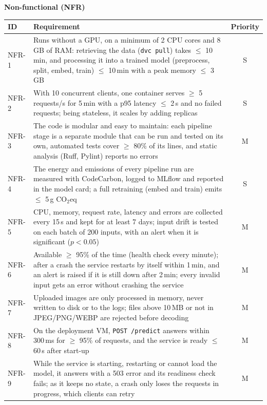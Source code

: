 \documentclass[11pt]{article}
\begin{document}
\newpage


\medskip\noindent\textbf{Non-functional (NFR)}\par\smallskip


\noindent\begin{tabularx}{\textwidth}{@{}l Y c@{}}
\toprule
\textbf{ID} & \textbf{Requirement} & \textbf{Priority} \\
\midrule
NFR-1 & Runs without a GPU, on a minimum of 2 CPU cores and 8\,GB of RAM: retrieving the data (\texttt{dvc pull}) takes $\leq$ 10\,min, and processing it into a trained model (preprocess, split, embed, train) $\leq$ 10\,min with a peak memory $\leq$ 3\,GB & S \medskip \\
NFR-2 & With 10 concurrent clients, one container serves $\geq$ 5 requests/s for 5\,min with a p95 latency $\leq$ 2\,s and no failed requests; being stateless, it scales by adding replicas & S \medskip \\
NFR-3 & The code is modular and easy to maintain: each pipeline stage is a separate module that can be run and tested on its own, automated tests cover $\geq$ 80\% of its lines, and static analysis (Ruff, Pylint) reports no errors & M \medskip \\
NFR-4 & The energy and emissions of every pipeline run are measured with CodeCarbon, logged to MLflow and reported in the model card; a full retraining (embed and train) emits $\leq$ 5\,g CO$_2$eq & S \medskip \\
NFR-5 & CPU, memory, request rate, latency and errors are collected every 15\,s and kept for at least 7 days; input drift is tested on each batch of 200 inputs, with an alert when it is significant ($p < 0.05$) & M \medskip \\
NFR-6 & Available $\geq$ 95\% of the time (health check every minute); after a crash the service restarts by itself within 1\,min, and an alert is raised if it is still down after 2\,min; every invalid input gets an error without crashing the service & M \medskip \\
NFR-7 & Uploaded images are only processed in memory, never written to disk or to the logs; files above 10\,MB or not in JPEG/PNG/WEBP are rejected before decoding & M \medskip \\
NFR-8 & On the deployment VM, \texttt{POST /predict} answers within 300\,ms for $\geq$ 95\% of requests, and the service is ready $\leq$ 60\,s after start-up & M \medskip \\
NFR-9 & While the service is starting, restarting or cannot load the model, it answers with a 503 error and its readiness check fails; as it keeps no state, a crash only loses the requests in progress, which clients can retry & M \medskip \\

\end{tabularx}
\end{document}
